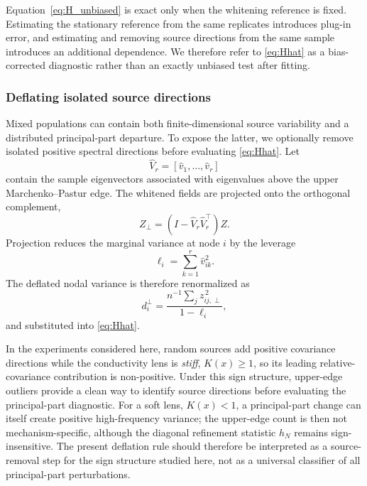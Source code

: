 \documentclass[11pt]{article}
\numberwithin{table}{section}
\numberwithin{figure}{section}
\begin{document}
Equation~\eqref{eq:H_unbiased} is exact only when the whitening reference is fixed. Estimating the stationary reference from the same replicates introduces plug-in error, and estimating and removing source directions from the same sample introduces an additional dependence. We therefore refer to \eqref{eq:Hhat} as a bias-corrected diagnostic rather than an exactly unbiased test after fitting.

\subsubsection{Deflating isolated source directions}
\label{sec:deflation}

Mixed populations can contain both finite-dimensional source variability and a distributed principal-part departure. To expose the latter, we optionally remove isolated positive spectral directions before evaluating \eqref{eq:Hhat}. Let
\begin{equation}
    \widehat V_r
    =
    [\widehat v_1,\ldots,\widehat v_r]
\end{equation}
contain the sample eigenvectors associated with eigenvalues above the upper Marchenko--Pastur edge. The whitened fields are projected onto the orthogonal complement,
\begin{equation}
    Z_\perp
    =
    (I-\widehat V_r\widehat V_r^\top)Z.
    \label{eq:deflate_Z}
\end{equation}
Projection reduces the marginal variance at node $i$ by the leverage
\begin{equation}
    \ell_i
    =
    \sum_{k=1}^{r}\widehat v_{ik}^2.
\end{equation}
The deflated nodal variance is therefore renormalized as
\begin{equation}
    d_i^\perp
    =
    \frac{
        n^{-1}\sum_j z_{ij,\perp}^{\,2}
    }{
        1-\ell_i
    },
    \label{eq:deflated_di}
\end{equation}
and substituted into \eqref{eq:Hhat}.

In the experiments considered here, random sources add positive covariance directions while the conductivity lens is \emph{stiff}, $K(x)\ge1$, so its leading relative-covariance contribution is non-positive. Under this sign structure, upper-edge outliers provide a clean way to identify source directions before evaluating the principal-part diagnostic. For a soft lens, $K(x)<1$, a principal-part change can itself create positive high-frequency variance; the upper-edge count is then not mechanism-specific, although the diagonal refinement statistic $h_N$ remains sign-insensitive. The present deflation rule should therefore be interpreted as a source-removal step for the sign structure studied here, not as a universal classifier of all principal-part perturbations.
\end{document}
